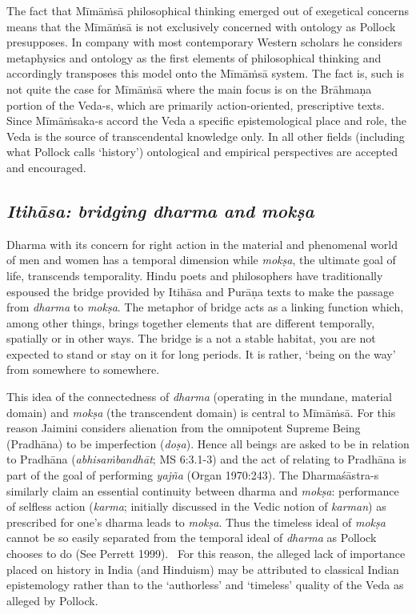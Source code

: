 The fact that Mīmāṁsā philosophical thinking emerged out of exegetical concerns means that the Mīmāṁsā is not exclusively concerned with ontology as Pollock presupposes. In company with most contemporary Western scholars he considers metaphysics and ontology as the first elements of philosophical thinking and accordingly transposes this model onto the Mīmāṁsā system. The fact is, such is not quite the case for Mīmāṁsā where the main focus is on the Brāhmaṇa portion of the Veda-s, which are primarily action-oriented, prescriptive texts. Since Mīmāṁsaka-s accord the Veda a specific epistemological place and role, the Veda is the source of transcendental knowledge only. In all other fields (including what Pollock calls ‘history’) ontological and empirical perspectives are accepted and encouraged.

\subsection*{\textit{Itihāsa: bridging dharma and mokṣa}}

Dharma with its concern for right action in the material and phenomenal world of men and women has a temporal dimension while \textit{mokṣa}, the ultimate goal of life, transcends temporality. Hindu poets and philosophers have traditionally espoused the bridge provided by Itihāsa and Purāṇa texts to make the passage from \textit{dharma} to \textit{mokṣa}. The metaphor of bridge acts as a linking function which, among other things, brings together elements that are different temporally, spatially or in other ways. The bridge is a not a stable habitat, you are not expected to stand or stay on it for long periods. It is rather, ‘being on the way’ from somewhere to somewhere.

This idea of the connectedness of \textit{dharma} (operating in the mundane, material domain) and \textit{mokṣa} (the transcendent domain) is central to Mīmāṁsā. For this reason Jaimini considers alienation from the omnipotent Supreme Being (Pradhāna) to be imperfection (\textit{doṣa}). Hence all beings are asked to be in relation to Pradhāna (\textit{abhisaṁbandhāt}; MS 6:3.1-3) and the act of relating to Pradhāna is part of the goal of performing \textit{yajña} (Organ 1970:243). The Dharmaśāstra-s similarly claim an essential continuity between dharma and \textit{mokṣa}: performance of selfless action (\textit{karma}; initially discussed in the Vedic notion of \textit{karman}) as prescribed for one's dharma leads to \textit{mokṣa}. Thus the timeless ideal of \textit{mokṣa} cannot be so easily separated from the temporal ideal of \textit{dharma} as Pollock chooses to do (See Perrett 1999).  For this reason, the alleged lack of importance placed on history in India (and Hinduism) may be attributed to classical Indian epistemology rather than to the ‘authorless’ and ‘timeless’ quality of the Veda as alleged by Pollock.


